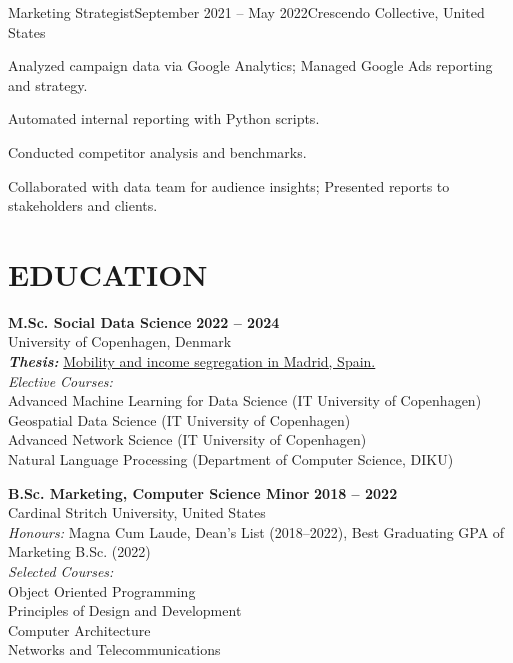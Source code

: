 \documentclass{resume}
\begin{document}
\begin{content}
    \begin{position}{Marketing Strategist}{September 2021 -- May 2022}{Crescendo Collective, United States}{}{}
        \item Analyzed campaign data via Google Analytics; Managed Google Ads reporting and strategy.
        \item Automated internal reporting with Python scripts.
        \item Conducted competitor analysis and benchmarks.
        \item Collaborated with data team for audience insights; Presented reports to stakeholders and clients.
    \end{position}
    

\end{content}

\section{EDUCATION} 
\begin{content}
    {\bf M.Sc. Social Data Science} \hfill {\bf 2022 -- 2024} \\
    University of Copenhagen, Denmark \\
    {\bf \em Thesis:} {\href{https://github.com/carobs9/segregation-madrid}{Mobility and income segregation in Madrid, Spain.}} \\ 
    {\em Elective Courses:} \\
    {\small
    Advanced Machine Learning for Data Science (IT University of Copenhagen) \\ 
    Geospatial Data Science (IT University of Copenhagen) \\
    Advanced Network Science (IT University of Copenhagen) \\
    Natural Language Processing (Department of Computer Science, DIKU) \\
    }


    {\bf B.Sc. Marketing, Computer Science Minor} \hfill {\bf 2018 -- 2022} \\
    Cardinal Stritch University, United States \\
    {\em Honours:} Magna Cum Laude, Dean's List (2018--2022), Best Graduating GPA of Marketing B.Sc. (2022) \\
    {\em Selected Courses:} \\
    {\small
    Object Oriented Programming \\ 
    Principles of Design and Development \\
    Computer Architecture \\
    Networks and Telecommunications\\
    }
\end{content}
\end{document}
